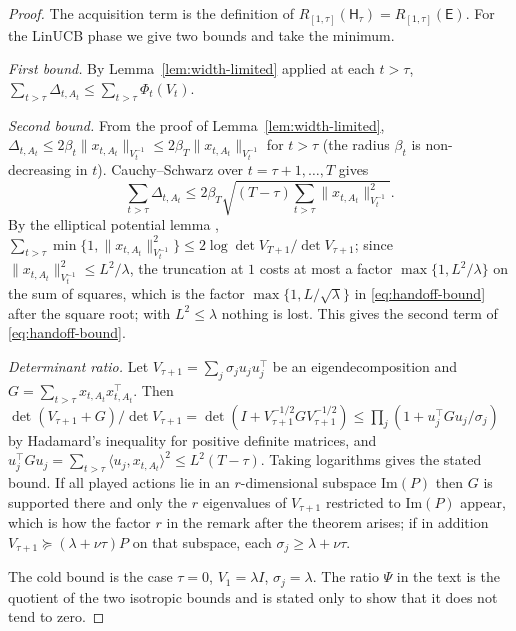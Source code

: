 \documentclass{article}
\theoremstyle{definition}
\theoremstyle{remark}
\theoremstyle{remark}
\newcommand{\Exp}{\mathsf{E}}
\newcommand{\Hyb}{\mathsf{H}}
\begin{document}
\begin{proof}
The acquisition term is the definition of $R_{[1,\tau]}(\Hyb_\tau)=R_{[1,\tau]}(\Exp)$.
For the LinUCB phase we give two bounds and take the minimum.

\emph{First bound.} By Lemma~\ref{lem:width-limited} applied at each
$t>\tau$, $\sum_{t>\tau}\Delta_{t,A_t}\le\sum_{t>\tau}\Phi_t(V_t)$.

\emph{Second bound.} From the proof of Lemma~\ref{lem:width-limited},
$\Delta_{t,A_t}\le2\beta_t\|x_{t,A_t}\|_{V_t^{-1}}\le2\beta_T\|x_{t,A_t}\|_{V_t^{-1}}$
for $t>\tau$ (the radius $\beta_t$ is non-decreasing in $t$). Cauchy--Schwarz
over $t=\tau+1,\dots,T$ gives
\[
\sum_{t>\tau}\Delta_{t,A_t}\le2\beta_T\sqrt{(T-\tau)\sum_{t>\tau}\|x_{t,A_t}\|^2_{V_t^{-1}}} .
\]
By the elliptical potential lemma \cite[Lemma~11]{abbasi2011improved},
$\sum_{t>\tau}\min\{1,\|x_{t,A_t}\|^2_{V_t^{-1}}\}\le2\log\det V_{T+1}/\det V_{\tau+1}$;
since $\|x_{t,A_t}\|^2_{V_t^{-1}}\le L^2/\lambda$, the truncation at $1$ costs at
most a factor $\max\{1,L^2/\lambda\}$ on the sum of squares, which is the
factor $\max\{1,L/\sqrt\lambda\}$ in \eqref{eq:handoff-bound} after the square
root; with $L^2\le\lambda$ nothing is lost. This gives
the second term of \eqref{eq:handoff-bound}.

\emph{Determinant ratio.} Let $V_{\tau+1}=\sum_j\sigma_ju_ju_j^\top$ be an
eigendecomposition and $G=\sum_{t>\tau}x_{t,A_t}x_{t,A_t}^\top$. Then
$\det(V_{\tau+1}+G)/\det V_{\tau+1}=\det(I+V_{\tau+1}^{-1/2}GV_{\tau+1}^{-1/2})\le\prod_j(1+u_j^\top Gu_j/\sigma_j)$
by Hadamard's inequality for positive definite matrices, and
$u_j^\top Gu_j=\sum_{t>\tau}\langle u_j,x_{t,A_t}\rangle^2\le L^2(T-\tau)$.
Taking logarithms gives the stated bound. If all played actions lie in an
$r$-dimensional subspace $\mathrm{Im}(P)$ then $G$ is supported there and only
the $r$ eigenvalues of $V_{\tau+1}$ restricted to $\mathrm{Im}(P)$ appear, which
is how the factor $r$ in the remark after the theorem arises; if in addition
$V_{\tau+1}\succeq(\lambda+\nu\tau)P$ on that subspace, each $\sigma_j\ge\lambda+\nu\tau$.

The cold bound is the case $\tau=0$, $V_1=\lambda I$, $\sigma_j=\lambda$. The
ratio $\Psi$ in the text is the quotient of the two isotropic bounds and is
stated only to show that it does not tend to zero.
\end{proof}
\end{document}
